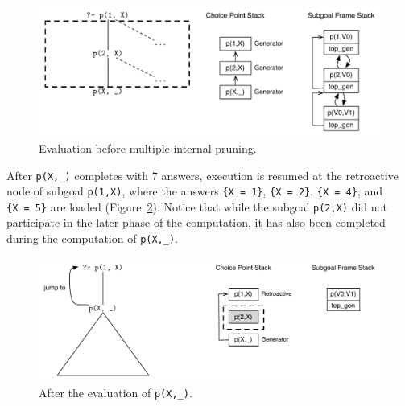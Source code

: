 \begin{figure}[ht]
  \centering
    \includegraphics[scale=0.6]{retro_multiple_internal1.pdf}
  \caption{Evaluation before multiple internal pruning.}
  \label{fig:retro_multiple_internal1}
\end{figure}

After \texttt{p(X,\_)} completes with 7 answers, 
execution is resumed at the retroactive node of
subgoal \texttt{p(1,X)}, where the answers
\texttt{\{X~=~1\}},
\texttt{\{X~=~2\}},
\texttt{\{X~=~4\}},
and \texttt{\{X~=~5\}}
are loaded
(Figure~\ref{fig:retro_multiple_internal2}).
Notice that while the subgoal \texttt{p(2,X)} did not participate in the later phase of the computation,
it has also been completed during the computation of \texttt{p(X,\_)}.



\begin{figure}[ht]
  \centering
    \includegraphics[scale=0.6]{retro_multiple_internal2.pdf}
  \caption{After the evaluation of \texttt{p(X,\_)}.}
  \label{fig:retro_multiple_internal2}
\end{figure}


